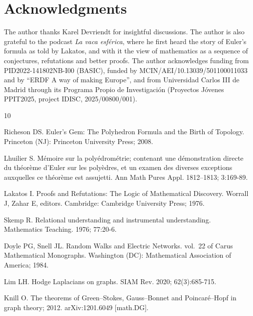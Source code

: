 \documentclass[11pt,a4paper]{article}
\theoremstyle{plain}
\theoremstyle{definition}
\begin{document}
\section*{Acknowledgments}
The author thanks Karel Devriendt for insightful discussions. The author is also grateful to the podcast \textit{La vaca esf\'erica}, where he first heard the story of Euler's formula as told by Lakatos, and with it the view of mathematics as a sequence of conjectures, refutations and better proofs. The author acknowledges funding from PID2022-141802NB-I00 (BASIC), funded by MCIN/AEI/10.13039/501100011033 and by ``ERDF A way of making Europe'', and from Universidad Carlos III de Madrid through its Programa Propio de Investigaci\'on (Proyectos J\'ovenes PPIT2025, project IDISC, 2025/00800/001).

\begin{thebibliography}{10}
\small\raggedright
\setlength{\itemsep}{2pt plus 1pt}
\setlength{\parskip}{0pt}

Richeson DS.
\newblock Euler's Gem: The Polyhedron Formula and the Birth of Topology.
\newblock Princeton (NJ): Princeton University Press; 2008.

Lhuilier S.
\newblock M{\'e}moire sur la poly{\'e}drom{\'e}trie; contenant une
  d{\'e}monstration directe du th{\'e}or{\`e}me d'{E}uler sur les
  poly{\`e}dres, et un examen des diverses exceptions auxquelles ce
  th{\'e}or{\`e}me est assujetti.
\newblock Ann Math Pures Appl. 1812--1813; 3:169-89.

Lakatos I.
\newblock Proofs and Refutations: The Logic of Mathematical Discovery.
\newblock Worrall J, Zahar E, editors. Cambridge: Cambridge University Press;
  1976.

Skemp R.
\newblock Relational understanding and instrumental understanding.
\newblock Mathematics Teaching. 1976; 77:20-6.

Doyle PG, Snell JL.
\newblock Random Walks and Electric Networks. vol.~22 of Carus Mathematical
  Monographs.
\newblock Washington (DC): Mathematical Association of America; 1984.

Lim LH.
\newblock Hodge {L}aplacians on graphs.
\newblock SIAM Rev. 2020; 62(3):685-715.

Knill O. The theorems of {G}reen--{S}tokes, {G}auss--{B}onnet and
  {P}oincar{\'e}--{H}opf in graph theory; 2012.
\newblock arXiv:1201.6049 [math.DG].


\end{thebibliography}
\end{document}

